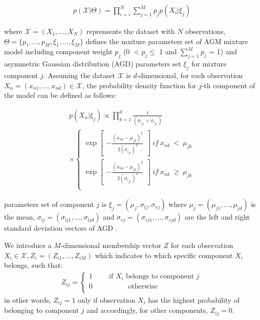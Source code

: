 \documentclass[conference]{IEEEtran}
\begin{document}
\begin{align}
p(\mathcal{X}|\Theta) = \prod_{i=i}^N \sum_{j=1}^Mp_jp(X_i|\xi_j)
\label{eq:likelihood}
\end{align}

where $\mathcal{X} = (X_1,...,X_N)$ reprensents the dataset with $N$ observations, $\Theta = \{p_1,...,p_M, \xi_1,...,\xi_M\}$ defines the mxiture parameters set of AGM mixture model including component weight $p_j$ (0 $< p_j \leq$ 1 and $\sum_{j=1}^Mp_j$ = 1) and asymmetric Gaussian distribution (AGD) parameters set $\xi_j$ for mixture component $j$. Assuming the dataset $\mathcal{X}$ is $d$-dimensional, for each observation $X_n = (x_{n1},...,x_{nd})\in\mathcal{X}$, the probability density function\cite{Elguebaly2014} for $j$-th component of the model can be defined as follows:

\begin{multline}
p(X_n|\xi_j) \propto \prod_{k=1}^{d} \frac{1}{(\sigma_{l_{jk}}+\sigma_{r_{jk}})} \\
\times \left\{\begin{matrix}
\exp \begin{bmatrix}
-\frac{(x_{nk}-\mu_{jk})^2}{2(\sigma_{l_{jk}})^2}
\end{bmatrix}\ if\ x_{nk}\ <\ \mu_{jk} \\ 
\exp \begin{bmatrix}
-\frac{(x_{nk}-\mu_{jk})^2}{2(\sigma_{r_{jk}})^2}
\end{bmatrix}\ if\ x_{nk}\ \geqslant\ \mu_{jk} \\ 
\end{matrix}\right.
\label{eq:pdf}
\end{multline}

parameters set of component $j$ is $\xi_j = (\mu_j,\sigma_{lj},\sigma_{rj})$ where $\mu_j = (\mu_{j1},...,\mu_{jd})$ is the mean, $\sigma_{lj} = (\sigma_{lj1},...,\sigma_{ljd})$ and $\sigma_{rj} = (\sigma_{rj1},...,\sigma_{rjd})$ are the left and right standard deviation vectors of AGD . 

We introduce a $M$-dimensional membership vector $Z$ for each observation $X_i\in\mathcal{X}, Z_i = (Z_{i1},...,Z_{iM})$ which indicates to which specific component $X_i$ belongs\cite{Bouguila2006}, such that:
\begin{align}
Z_{ij} = \left\{\begin{matrix}
1\qquad\mbox{ if }X_i\mbox{  belongs to component }j \\
0\qquad\quad\qquad \mbox{otherwise} \qquad\qquad\quad\quad \\
\end{matrix}\right.
\label{eq:memVector}
\end{align}
in other words, $Z_{ij} = 1$ only if observation $X_i$ has the highest probability of belonging to component $j$ and accordingly, for other components, $Z_{ij} = 0$. 
\end{document}
